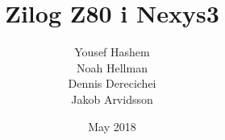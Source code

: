 \usepackage[utf8]{inputenc}
\usepackage[swedish]{babel}

\usepackage[backend=bibtex8]{biblatex}

\usepackage{csquotes}

\usepackage{graphicx}
\usepackage{subfiles}
\usepackage{array}
\usepackage{float}
\usepackage[a4paper, total={16cm, 25cm}]{geometry}

\title{\Huge Zilog Z80 i Nexys3}
\author{\LARGE Yousef Hashem\\
        \LARGE Noah Hellman\\
        \LARGE Dennis Derecichei\\ 
        \LARGE Jakob Arvidsson}
\date{\Large May 2018}

\newcommand\mono[1]{\texttt{#1}}
